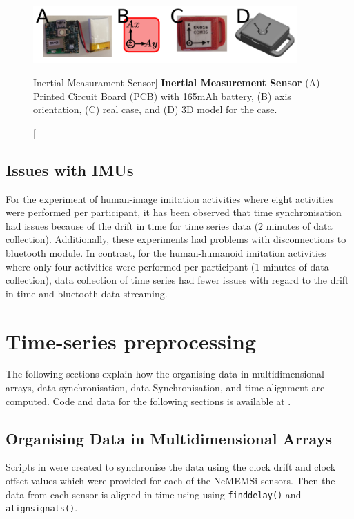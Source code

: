 \begin{figure}
 \centering
   \includegraphics[width=0.9\textwidth]{muse}
   \caption
	[Inertial Measurament Sensor]{
	{\bf Inertial Measurement Sensor}
		(A) Printed Circuit Board (PCB) with 165mAh battery,
		(B) axis orientation, 
		(C) real case, and 
		(D) 3D model for the case.
}
   \label{fig:muse}
\end{figure}

\subsection{Issues with IMUs} \label{appendix:imus:issues}
For the experiment of human-image imitation activities where eight activities 
were performed per participant, it has been observed that time 
synchronisation had issues because of the drift in time for time series data
(2 minutes of data collection).
Additionally, these experiments
had problems with disconnections to bluetooth module. 
In contrast, for the human-humanoid imitation activities
where only four activities were performed per participant 
(1 minutes of data collection), 
data collection of time series had fewer issues with regard 
to the drift in time and bluetooth data streaming.  


\section{Time-series preprocessing} \label{appendix:tps}

The following sections explain how the 
organising data in multidimensional arrays,
data synchronisation, data Synchronisation, and 
time alignment are computed. 
Code and data for the following sections is available at
.

\subsection{Organising Data in Multidimensional Arrays}
Scripts in \MATLAB were created to synchronise the data using the clock 
drift and clock offset values which were provided for each of the 
NeMEMSi sensors. Then the data from each sensor is aligned in 
time using using \texttt{finddelay()} and \texttt{alignsignals()}.

